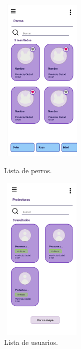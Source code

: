 \documentclass[a4paper, 12pt]{article}
\begin{document}
\begin{figure}[H]
   	\begin{minipage}{0.48\textwidth}
		\begin{center}
			{\includegraphics[height=8cm, width=4cm]{design/DogList.jpg}\par}
			\caption{Lista de perros.}
			\medskip
		\end{center}  
	\end{minipage}\hfill
   	\begin{minipage}{0.48\textwidth}
		\begin{center}
			{\includegraphics[height=8cm, width=4cm]{design/UserList.jpg}\par}
			\caption{Lista de usuarios.}
			\medskip
		\end{center}  
	\end{minipage}\hfill
\end{figure}
\end{document}
